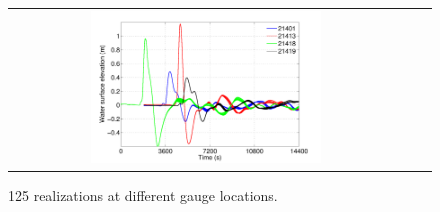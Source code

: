 \begin{figure}[ht]
\centering
\begin{tabular}{clc}        
\includegraphics[width=0.6\textwidth]{./figures/rlzs_gauges.pdf} 
\end{tabular}
\caption{125 \geoclaw realizations at different gauge locations.}
\label{fig:rlzs}
\end{figure}

